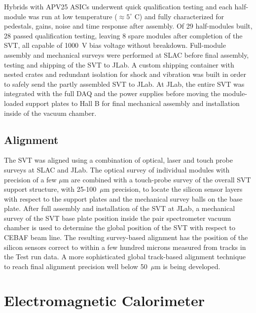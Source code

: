 \documentclass[final,3p,times,twocolumn]{elsarticle}
\begin{document}
Hybrids with APV25 ASICs underwent quick qualification testing and each half-module was run at low 
temperature ($\approx5^{\circ}$ C) and fully characterized for pedestals, gains, noise and time response 
after assembly.  Of 29 half-modules built, 28 passed qualification testing, leaving 8 spare modules after 
completion of the SVT, all capable of 1000~V bias voltage without breakdown.  Full-module assembly 
and mechanical surveys were performed at SLAC before final assembly, testing and shipping of the 
SVT to JLab. A custom shipping container with nested crates and redundant isolation for shock and 
vibration was built in order to safely send the partly assembled SVT to JLab. At JLab, the entire SVT was 
integrated with the full DAQ and the power supplies before moving the module-loaded support plates to 
Hall B for final mechanical assembly and installation inside of the vacuum chamber.

\subsection{Alignment}
The SVT was aligned using a combination of optical, laser and touch probe surveys at SLAC and JLab. 
The optical survey of individual modules with precision of a few $\mu$m are combined with a 
touch-probe survey of the overall SVT support structure, with 25-100~$\mu$m precision, to locate the 
silicon sensor layers with respect to the support plates and the mechanical survey balls on the base 
plate. After full assembly and installation of the SVT at JLab, a mechanical survey of the SVT base plate 
position inside the pair spectrometer vacuum chamber is used to determine the global position of the 
SVT with respect to CEBAF beam line. The resulting survey-based alignment has the position of the 
silicon sensors correct to within a few hundred microns measured from tracks in the Test run data. 
A more sophisticated global track-based alignment technique to reach final alignment precision 
well below 50~$\mu$m is being developed.




\section{Electromagnetic Calorimeter}
\label{sec:ecal}
\end{document}
